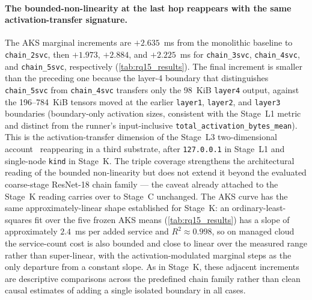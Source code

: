 \paragraph{The bounded-non-linearity at the last hop reappears with the same activation-transfer signature.}
The AKS marginal increments are $+2.635$~ms from the monolithic baseline to
\texttt{chain\_2svc}, then $+1.973$, $+2.884$, and $+2.225$~ms for
\texttt{chain\_3svc}, \texttt{chain\_4svc}, and \texttt{chain\_5svc},
respectively (\cref{tab:rq15_results}). The final increment is smaller than the
preceding one because the layer-4 boundary that distinguishes
\texttt{chain\_5svc} from \texttt{chain\_4svc} transfers only the
98~KiB \texttt{layer4} output, against the 196--784~KiB tensors moved
at the earlier \texttt{layer1}, \texttt{layer2}, and \texttt{layer3}
boundaries (boundary-only activation sizes, consistent with the Stage~L1
metric and distinct from the runner's input-inclusive
\texttt{total\_activation\_bytes\_mean}). This is the activation-transfer
dimension of the Stage~L3 two-dimensional
account~\cite{deeperthings} reappearing in a third substrate, after
\texttt{127.0.0.1} in Stage~L1 and single-node \texttt{kind} in Stage~K.
The triple coverage strengthens the architectural reading of the
bounded non-linearity but does not extend it beyond the evaluated
coarse-stage ResNet-18 chain family --- the caveat already attached to
the Stage~K reading carries over to Stage~C unchanged. The AKS curve has
the same approximately-linear shape established for Stage~K: an
ordinary-least-squares fit over the five frozen AKS means
(\cref{tab:rq15_results}) has a slope of approximately $2.4$~ms per added
service and $R^{2}\approx0.998$, so on managed cloud the service-count cost is
also bounded and close to linear over the measured range rather than
super-linear, with the activation-modulated marginal steps as the only
departure from a constant slope.
As in Stage~K, these adjacent increments are descriptive comparisons across the
predefined chain family rather than clean causal estimates of adding a single
isolated boundary in all cases.

